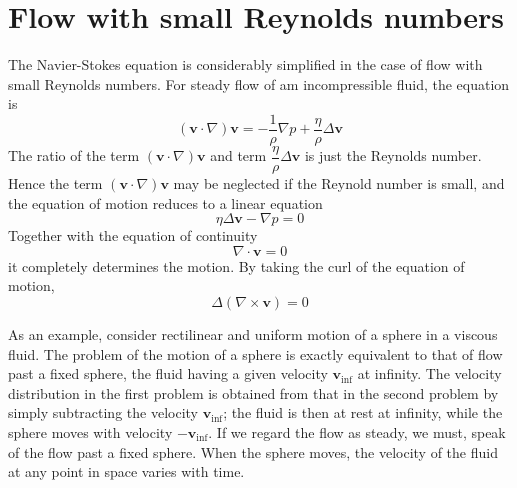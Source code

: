 \documentclass[conference]{IEEEtran}
\theoremstyle{definition}
\theoremstyle{remark}
\begin{document}
    \section{Flow with small Reynolds numbers}
    The Navier-Stokes equation is considerably simplified in the case of flow with small Reynolds numbers. For steady flow of am incompressible fluid, the equation is
    \begin{equation*}
        (\mathbf{v} \cdot \nabla) \mathbf{v} = -\dfrac1\rho \nabla p + \dfrac{\eta}{\rho} \Delta \mathbf{v}
    \end{equation*}
    The ratio of the term $(\mathbf{v} \cdot \nabla) \mathbf{v}$ and term $\dfrac{\eta}{\rho} \Delta \mathbf{v}$ is just the Reynolds number. Hence the term $(\mathbf{v} \cdot \nabla) \mathbf{v}$ may be neglected if the Reynold number is small, and the equation of motion reduces to a linear equation
    \begin{equation}
        \eta \Delta \mathbf{v} - \nabla p = 0
        \label{eq:equation_of_motion_stokes}
    \end{equation}
    Together with the equation of continuity
    \begin{equation}
        \nabla \cdot \mathbf{v} = 0
    \end{equation}
    it completely determines the motion. By taking the curl of the equation of motion,
    \begin{equation}
        \Delta (\nabla \times \mathbf{v}) = 0
        \label{eq:curl_of_equation_of_stokes_flow}
    \end{equation}

    As an example, consider rectilinear and uniform motion of a sphere in a viscous fluid. The problem of the motion of a sphere is exactly equivalent to that of flow past a fixed sphere, the fluid having a given velocity $\mathbf{v}_{\mathrm{inf}}$ at infinity. The velocity distribution in the first problem is obtained from that in the second problem by simply subtracting the velocity $\mathbf{v}_{\mathrm{inf}}$; the fluid is then at rest at infinity, while the sphere moves with velocity $-\mathbf{v}_{\mathrm{inf}}$. If we regard the flow as steady, we must, speak of the flow past a fixed sphere. When the sphere moves, the velocity of the fluid at any point in space varies with time.
\end{document}
